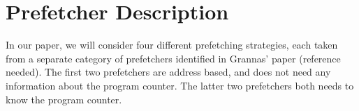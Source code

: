 
\section{Prefetcher Description}
\label{sec:prefetcherDescription}

In our paper, we will consider four different prefetching strategies,
each taken from a separate category of prefetchers identified in
Grannas' paper (reference needed). The first two prefetchers are address based, and does not need any information about the program counter. The latter two prefetchers both needs to know the program counter. 





